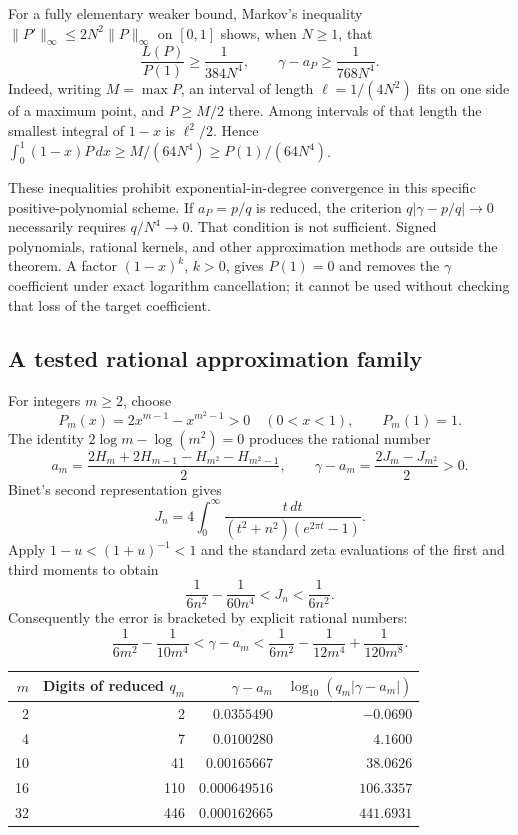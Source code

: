\documentclass[11pt,a4paper]{article}
\theoremstyle{definition}
\theoremstyle{remark}
\numberwithin{equation}{section}
\begin{document}
For a fully elementary weaker bound, Markov's inequality
$\lVert P'\rVert_\infty\le2N^2\lVert P\rVert_\infty$ on $[0,1]$
shows, when $N\ge1$, that
\begin{equation}
 \frac{L(P)}{P(1)}\ge\frac1{384N^4},
 \qquad\gamma-a_P\ge\frac1{768N^4}.
 \label{gamma-elementary-bound}
\end{equation}
Indeed, writing $M=\max P$, an interval of length
$\ell=1/(4N^2)$ fits on one side of a maximum point, and $P\ge M/2$
there. Among intervals of that length the smallest integral of $1-x$
is $\ell^2/2$. Hence
$\int_0^1(1-x)P\,dx\ge M/(64N^4)\ge P(1)/(64N^4)$.

These inequalities prohibit exponential-in-degree convergence in this
specific positive-polynomial scheme. If $a_P=p/q$ is reduced, the
criterion $q|\gamma-p/q|\to0$ necessarily requires $q/N^4\to0$.
That condition is not sufficient. Signed polynomials, rational kernels,
and other approximation methods are outside the theorem. A factor
$(1-x)^k$, $k>0$, gives $P(1)=0$ and removes the $\gamma$ coefficient
under exact logarithm cancellation; it cannot be used without checking
that loss of the target coefficient.

\subsection{A tested rational approximation family}
\label{gamma-test-family}

For integers $m\ge2$, choose
\[
 P_m(x)=2x^{m-1}-x^{m^2-1}>0\quad(0<x<1),\qquad P_m(1)=1.
\]
The identity $2\log m-\log(m^2)=0$ produces the rational number
\[
 a_m=\frac{2H_m+2H_{m-1}-H_{m^2}-H_{m^2-1}}2,
 \qquad\gamma-a_m=\frac{2J_m-J_{m^2}}2>0.
\]
Binet's second representation gives
\[
 J_n=4\int_0^\infty
 \frac{t\,dt}{(t^2+n^2)(e^{2\pi t}-1)}.
\]
Apply $1-u<(1+u)^{-1}<1$ and the standard zeta evaluations of
the first and third moments to obtain
\[
 \frac1{6n^2}-\frac1{60n^4}<J_n<\frac1{6n^2}.
\]
Consequently the error is bracketed by explicit rational numbers:
\begin{equation}
 \frac1{6m^2}-\frac1{10m^4}<\gamma-a_m
 <\frac1{6m^2}-\frac1{12m^4}+\frac1{120m^8}.
 \label{gamma-error-bracket}
\end{equation}

\begin{center}
\begin{tabular}{rrrr}
\toprule
$m$&Digits of reduced $q_m$&$\gamma-a_m$&
$\log_{10}(q_m|\gamma-a_m|)$\\
\midrule
2&2&$0.0355490$&$-0.0690$\\
4&7&$0.0100280$&$4.1600$\\
10&41&$0.00165667$&$38.0626$\\
16&110&$0.000649516$&$106.3357$\\
32&446&$0.000162665$&$441.6931$\\
\bottomrule
\end{tabular}
\end{center}
\end{document}
